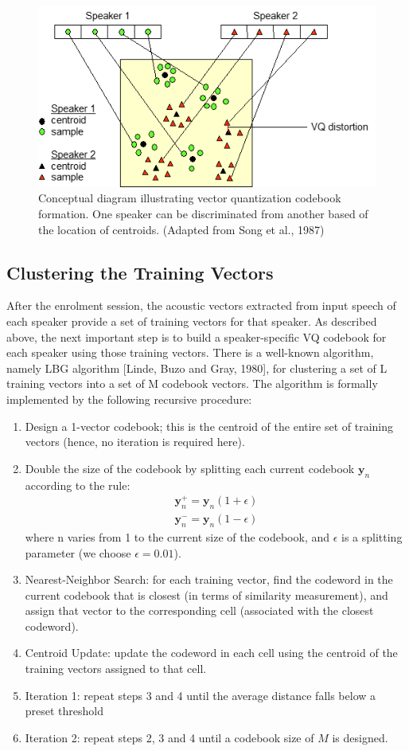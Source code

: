 \documentclass{article}
\def\y{\mathbf{y}}
\begin{document}
\begin{figure}
    \centering
    \includegraphics[width=.8\textwidth]{Picture3.png}
    \caption{Conceptual diagram illustrating vector quantization codebook formation. One speaker can be discriminated from another based of the location of centroids. (Adapted from Song et al., 1987)
    }
\end{figure}

\subsection{Clustering the Training Vectors}
After the enrolment session, the acoustic vectors extracted from input speech of each speaker provide a set of training vectors for that speaker.  As described above, the next important step is to build a speaker-specific VQ codebook for each speaker using those training vectors.  There is a well-known algorithm, namely LBG algorithm [Linde, Buzo and Gray, 1980], for clustering a set of L training vectors into a set of M codebook vectors.  The algorithm is formally implemented by the following recursive procedure:

\begin{enumerate}
    \item Design a 1-vector codebook; this is the centroid of the entire set of training vectors (hence, no iteration is required here).
    \item Double the size of the codebook by splitting each current codebook $\y_n$ according to the rule:
    \begin{gather*}
        \y_n^+ = \y_n(1+\epsilon)\\
        \y_n^- = \y_n(1-\epsilon)
    \end{gather*}
    where n varies from 1 to the current size of the codebook, and $\epsilon$ is a splitting parameter (we choose $\epsilon=0.01$).
    \item Nearest-Neighbor Search: for each training vector, find the codeword in the current codebook that is closest (in terms of similarity measurement), and assign that vector to the corresponding cell (associated with the closest codeword).
    \item Centroid Update: update the codeword in each cell using the centroid of the training vectors assigned to that cell.
    \item Iteration 1: repeat steps 3 and 4 until the average distance falls below a preset threshold
    \item Iteration 2: repeat steps 2, 3 and 4 until a codebook size of $M$ is designed.

\end{enumerate}
\end{document}
